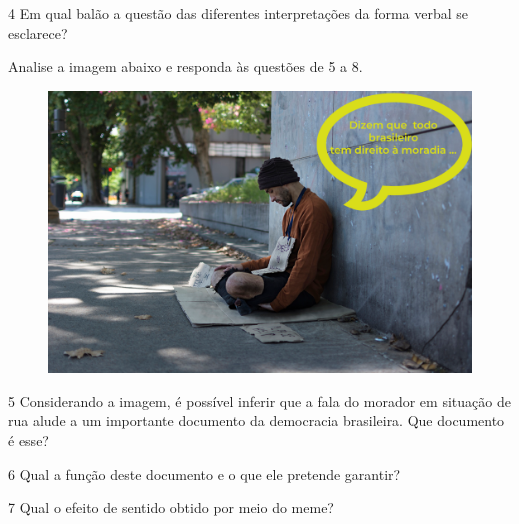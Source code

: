 
\num{4} Em qual balão a questão das diferentes interpretações da 
forma verbal se esclarece?


Analise a imagem abaixo e responda às questões de 5 a 8. 

\begin{figure}[h!]
\centering\includegraphics[width=5in]{./imgSAEB_7_POR/media/image5.png}
\end{figure}

\num{5} Considerando a imagem, é possível
inferir que a fala do morador em situação de rua alude a um importante
documento da democracia brasileira. Que documento é
esse?


\num{6} Qual a função deste documento e o que ele pretende garantir?


\num{7} Qual o efeito de sentido obtido por meio do meme?


